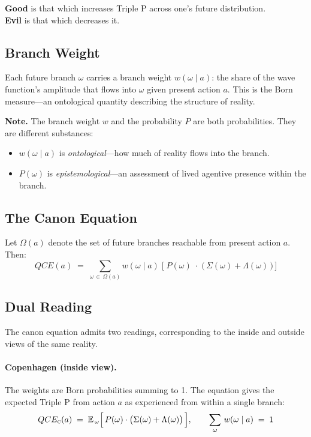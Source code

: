 \documentclass[12pt]{article}
\begin{document}
\medskip
\textbf{Good} is that which increases Triple P across one's future distribution.\\
\textbf{Evil} is that which decreases it.

\subsection{Branch Weight}

Each future branch $\omega$ carries a branch weight $w(\omega\mid a)$: the share of the wave function's amplitude that flows into $\omega$ given present action $a$. This is the Born measure---an ontological quantity describing the structure of reality.

\textbf{Note.} The branch weight $w$ and the probability $P$ are both probabilities. They are different substances:
\begin{itemize}
\item $w(\omega\mid a)$ is \textit{ontological}---how much of reality flows into the branch.
\item $P(\omega)$ is \textit{epistemological}---an assessment of lived agentive presence within the branch.
\end{itemize}

\subsection{The Canon Equation}

Let $\Omega(a)$ denote the set of future branches reachable from present action $a$. Then:
\begin{equation}
\boxed{\;QCE(a)\;=\;\sum_{\omega\,\in\,\Omega(a)} w(\omega\mid a)\;\Big[\;P(\omega)\;\cdot\;\big(\,\Sigma(\omega)+\Lambda(\omega)\,\big)\,\Big]\;}
\end{equation}

\subsection{Dual Reading}

The canon equation admits two readings, corresponding to the inside and outside views of the same reality.

\paragraph{Copenhagen (inside view).}
The weights are Born probabilities summing to 1. The equation gives the expected Triple P from action $a$ as experienced from within a single branch:
\begin{equation}
QCE_{\textsc{c}}(a)\;=\;\mathbb{E}_{\,\omega}\Big[\,P(\omega)\cdot\big(\Sigma(\omega)+\Lambda(\omega)\big)\,\Big],\qquad \sum_{\omega}\,w(\omega\mid a)\;=\;1
\end{equation}
\end{document}
